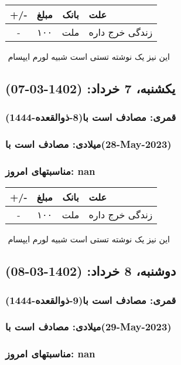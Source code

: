 \documentclass{article}
\newcommand{\rnote}[1]{\marginpar{\textcolor{color}{\StrSubstitute{\##1}{ }{\_}}}}
\newcommand{\myRow}[4]{
    #1 & #2 & #3 & #4 \\ \hline
}
\begin{document}
\begin{tabular}{ | c | c | c | p{5cm} |}
    \hline
    \myRow{ +/- }{مبلغ}{بانک}{علت}
    \myRow{-}{۱۰۰}{ملت}{زندگی خرج داره}
\end{tabular}
\newline
\newline

‌
\rnote{تست}
این نیز یک نوشته تستی است شبیه لورم ایپسام




\newpage
{}
\textcolor{color}{
\section{ یکشنبه، 7 خرداد: (1402-03-07) }
\subsubsection*{قمری: مصادف است با(8-ذوالقعده-1444)} 
\subsubsection*{میلادی: مصادف است با(28-May-2023)}
\subsubsection*{مناسبتهای امروز: nan}
}


\begin{tabular}{ | c | c | c | p{5cm} |}
    \hline
    \myRow{ +/- }{مبلغ}{بانک}{علت}
    \myRow{-}{۱۰۰}{ملت}{زندگی خرج داره}
\end{tabular}
\newline
\newline

‌
\rnote{تست}
این نیز یک نوشته تستی است شبیه لورم ایپسام




\newpage
{}
\textcolor{color}{
\section{ دوشنبه، 8 خرداد: (1402-03-08) }
\subsubsection*{قمری: مصادف است با(9-ذوالقعده-1444)} 
\subsubsection*{میلادی: مصادف است با(29-May-2023)}
\subsubsection*{مناسبتهای امروز: nan}
}
\end{document}
